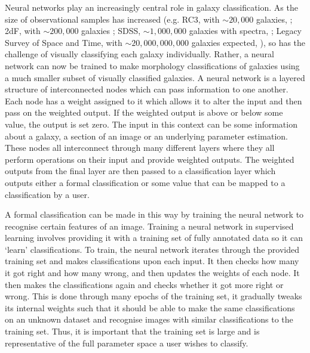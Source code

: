Neural networks play an increasingly central role in galaxy classification. As the size of observational samples has increased (e.g. RC3, with $\sim 20,000$ galaxies, \citealt{1991rc3..book.....D}; 2dF, with $\sim 200,000$ galaxies \citealt{2001MNRAS.328.1039C}; SDSS, $\sim 1,000,000$ galaxies with spectra, \citealt{2000AJ....120.1579Y, 2009ApJS..182..543A}; Legacy Survey of Space and Time, with $\sim 20,000,000,000$ galaxies expected, \citealt{2019ApJ...873..111I}), so has the challenge of visually classifying each galaxy individually. Rather, a neural network can now be trained to make morphology classifications of galaxies using a much smaller subset of visually classified galaxies. A neural network is a layered structure of interconnected nodes which can pass information to one another. Each node has a weight assigned to it which allows it to alter the input and then pass on the weighted output. If the weighted output is above or below some value, the output is set zero. The input in this context can be some information about a galaxy, a section of an image or an underlying parameter estimation. These nodes all interconnect through many different layers where they all perform operations on their input and provide weighted outputs. The weighted outputs from the final layer are then passed to a classification layer which outputs either a formal classification or some value that can be mapped to a classification by a user.

A formal classification can be made in this way by training the neural network to recognise certain features of an image. Training a neural network in supervised learning involves providing it with a training set of fully annotated data so it can `learn' classifications. To train, the neural network iterates through the provided training set and makes classifications upon each input. It then checks how many it got right and how many wrong, and then updates the weights of each node. It then makes the classifications again and checks whether it got more right or wrong. This is done through many epochs of the training set, it gradually tweaks its internal weights such that it should be able to make the same classifications on an unknown dataset and recognise images with similar classifications to the training set. Thus, it is important that the training set is large and is representative of the full parameter space a user wishes to classify.

